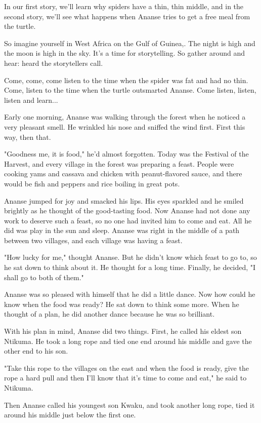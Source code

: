 In our first story, we'll learn why spiders have a thin, thin middle, and in the second story, we'll see what happens when Ananse tries to get a free meal from the turtle.

So imagine yourself in West Africa on the Gulf of Guinea,. The night is high and the moon is high in the sky. It's a time for storytelling. So gather around and hear: heard the storytellers call.

Come, come, come listen to the time when the spider was fat and had no thin. Come, listen to the time when the turtle outsmarted Ananse. Come listen, listen, listen and learn...

Early one morning, Ananse was walking through the forest when he noticed a very pleasant smell. He wrinkled his nose and sniffed the wind first. First this way, then that.

"Goodness me, it is food," he'd almost forgotten. Today was the Festival of the Harvest, and every village in the forest was preparing a feast. People were cooking yams and cassava and chicken with peanut-flavored sauce, and there would be fish and peppers and rice boiling in great pots.

Ananse jumped for joy and smacked his lips. His eyes sparkled and he smiled brightly as he thought of the good-tasting food. Now Ananse had not done any work to deserve such a feast, so no one had invited him to come and eat. All he did was play in the sun and sleep. Ananse was right in the middle of a path between two villages, and each village was having a feast.

"How lucky for me," thought Ananse. But he didn't know which feast to go to, so he sat down to think about it. He thought for a long time. Finally, he decided, "I shall go to both of them."

Ananse was so pleased with himself that he did a little dance. Now how could he know when the food was ready? He sat down to think some more. When he thought of a plan, he did another dance because he was so brilliant.

With his plan in mind, Ananse did two things. First, he called his eldest son Ntikuma. He took a long rope and tied one end around his middle and gave the other end to his son.

"Take this rope to the villages on the east and when the food is ready, give the rope a hard pull and then I'll know that it's time to come and eat," he said to Ntikuma.

Then Ananse called his youngest son Kwaku, and took another long rope, tied it around his middle just below the first one.

